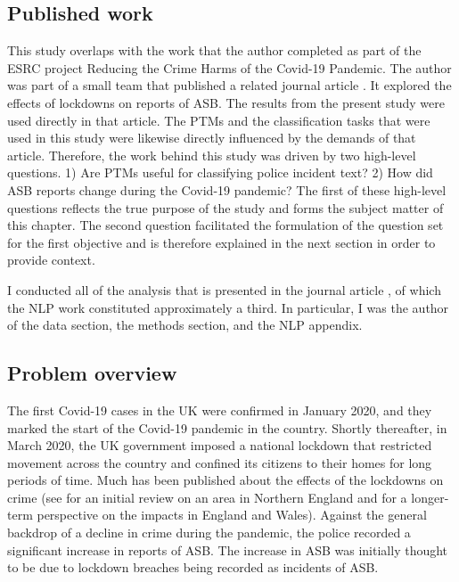  
 \subsection{Published work} This study overlaps with the work that the author completed as part of the ESRC project Reducing the Crime Harms of the Covid-19 Pandemic. The author was part of a small team that published a related journal article  \parencite{halford_dixon_farrell_2022}. It explored the effects of lockdowns on reports of ASB. The results from the present study were used directly in that article. The PTMs and the classification tasks that were used in this study were likewise directly influenced by the demands of that article. Therefore, the work behind this study was driven by two high-level questions. 1) Are PTMs useful for classifying police incident text? 2) How did ASB reports change during the Covid-19 pandemic? The first of these high-level questions reflects the true purpose of the study and forms the subject matter of this chapter. The second question facilitated the formulation of the question set for the first objective and is therefore explained in the next section in order to provide context. 

I conducted all of the analysis that is presented in the journal article \parencite{halford_dixon_farrell_2022}, of which the NLP work constituted approximately a third. In particular, I was the author of the data section, the methods section, and the NLP appendix.

\subsection{Problem overview} The first Covid-19 cases in the UK were confirmed in January 2020, and they marked the start of the Covid-19 pandemic in the country. Shortly thereafter, in March 2020, the UK government imposed a national lockdown that restricted movement across the country and confined its citizens to their homes for long periods of time. Much has been published about the effects of the lockdowns on crime (see \parencite{halford2020crime} for an initial review on an area in Northern England and \parencite{langton2021six}  for a longer-term perspective on the impacts in England and Wales). Against the general backdrop of a decline in crime during the pandemic, the police recorded a significant increase in reports of ASB. The increase in ASB was initially thought to be due to lockdown breaches being recorded as incidents of ASB. 

